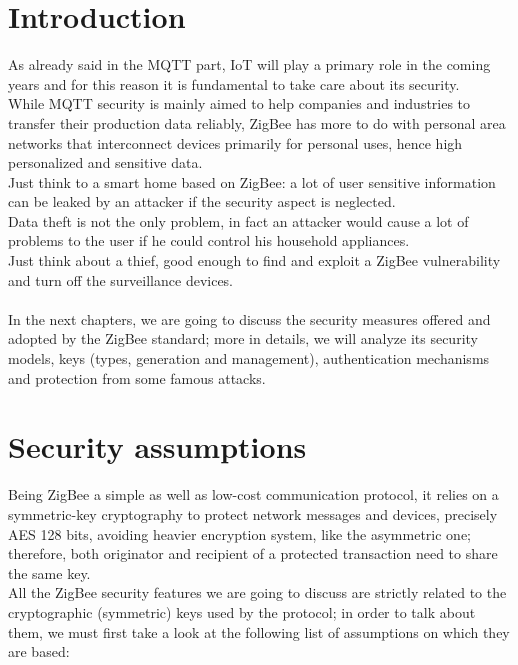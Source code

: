 \documentclass[12pt]{report}
\begin{document}
{\section{Introduction}
\bigskip
As already said in the MQTT part, IoT will play a primary role in the coming years and for this reason it is fundamental to take care about its security.\\
While MQTT security is mainly aimed to help companies and industries to transfer their production data reliably, ZigBee has more to do with personal area networks that interconnect devices primarily for personal uses, hence high personalized and sensitive data.\\
Just think to a smart home based on ZigBee: a lot of user sensitive information can be leaked by an attacker if the security aspect is neglected.\\
Data theft is not the only problem, in fact an attacker would cause a lot of problems to the user if he could control his household appliances.\\
Just think about a thief, good enough to find and exploit a ZigBee vulnerability and turn off the surveillance devices.\\\\

In the next chapters, we are going to discuss the security measures offered and adopted by the ZigBee standard; more in details, we will analyze its security models, keys (types, generation and management), authentication mechanisms and protection from some famous attacks.\\


\clearpage
\section{Security assumptions}
\bigskip
Being ZigBee a simple as well as low-cost communication protocol, it relies on a symmetric-key cryptography to protect network messages and devices, precisely AES 128 bits, avoiding heavier encryption system, like the asymmetric one; therefore, both originator and recipient of a protected transaction need to share the same key.\\
All the ZigBee security features we are going to discuss are strictly related to the cryptographic (symmetric) keys used by the protocol; in order to talk about them, we must first take a look at the following list of assumptions on which they are based:

}
\end{document}
